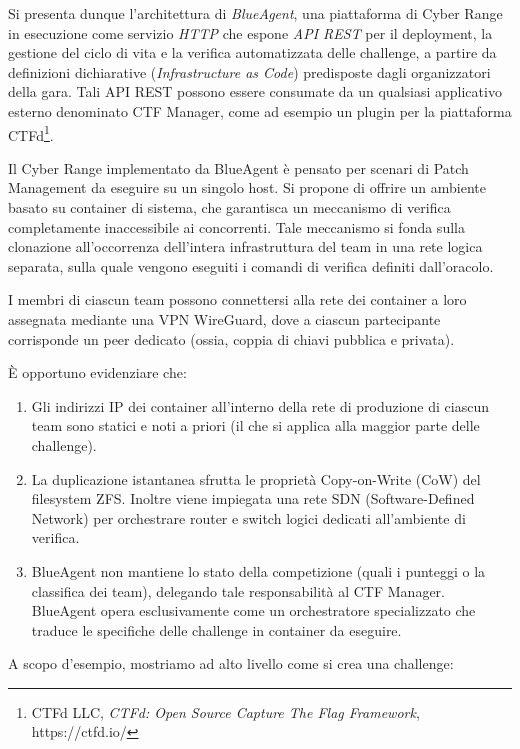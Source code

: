 Si presenta dunque l'architettura di \emph{BlueAgent}, una piattaforma
di Cyber Range in esecuzione come servizio \emph{HTTP} che espone
\emph{API REST} per il deployment, la gestione del ciclo di vita e la
verifica automatizzata delle challenge, a partire da definizioni
dichiarative (\emph{Infrastructure as Code}) predisposte dagli
organizzatori della gara. Tali API REST possono essere consumate da un
qualsiasi applicativo esterno denominato CTF Manager, come ad esempio un
plugin per la piattaforma CTFd\footnote{\label{fn:ref_13}CTFd LLC, \emph{CTFd: Open
  Source Capture The Flag Framework}, https://ctfd.io/}.

Il Cyber Range implementato da BlueAgent è pensato per scenari di Patch
Management da eseguire su un singolo host. Si propone di offrire un
ambiente basato su container di sistema, che garantisca un meccanismo di
verifica completamente inaccessibile ai concorrenti. Tale meccanismo si
fonda sulla clonazione all'occorrenza dell'intera infrastruttura del
team in una rete logica separata, sulla quale vengono eseguiti i comandi
di verifica definiti dall'oracolo.

I membri di ciascun team possono connettersi alla rete dei container a
loro assegnata mediante una VPN WireGuard, dove a ciascun partecipante
corrisponde un peer dedicato (ossia, coppia di chiavi pubblica e
privata).

È opportuno evidenziare che:

\begin{enumerate}
\def\labelenumi{\arabic{enumi}.}
\tightlist
\item
  Gli indirizzi IP dei container all'interno della rete di produzione di
  ciascun team sono statici e noti a priori (il che si applica alla
  maggior parte delle challenge).
\item
  La duplicazione istantanea sfrutta le proprietà Copy-on-Write (CoW)
  del filesystem ZFS. Inoltre viene impiegata una rete SDN
  (Software-Defined Network) per orchestrare router e switch logici
  dedicati all'ambiente di verifica.
\item
  BlueAgent non mantiene lo stato della competizione (quali i punteggi o
  la classifica dei team), delegando tale responsabilità al CTF Manager.
  BlueAgent opera esclusivamente come un orchestratore specializzato che
  traduce le specifiche delle challenge in container da eseguire.
\end{enumerate}

A scopo d'esempio, mostriamo ad alto livello come si crea una challenge:

